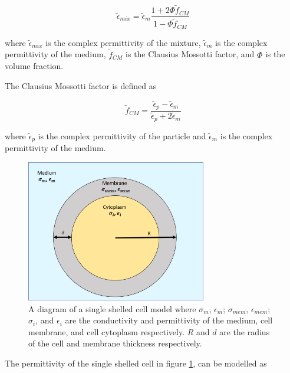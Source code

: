   \begin{equation}
      \tilde{\epsilon}_{mix} = \tilde{\epsilon}_m\frac{1 + 2\Phi\tilde{f}_{CM}}{1-\Phi\tilde{f}_{CM}}
  \end{equation}
  
  \noindent where $\tilde{\epsilon}_{mix}$ is the complex permittivity of the mixture, $\tilde{\epsilon}_m$ is the complex permittivity of the medium, $\tilde{f}_{CM}$ is the Clausius Mossotti factor, and $\Phi$ is the volume fraction.
  
  \par The Clausius Mossotti factor is defined as 
  
  \begin{equation}
    \tilde{f}_{CM} = \frac{\tilde{\epsilon}_p - \tilde{\epsilon}_m}{\tilde{\epsilon}_p + 2\tilde{\epsilon}_m} 
  \end{equation}
  
  \noindent
  
  where $\tilde{\epsilon}_p$ is the complex permittivity of the particle and $\tilde{\epsilon}_m$ is the complex permittivity of the medium. 

 \begin{figure}[ht]
 \centering
 \includegraphics[width=0.7\textwidth]{images/singleShelledCell.png}
 \caption[Diagram of single shelled cell model.]{A diagram of a single shelled cell model where $\sigma_m$, $\epsilon_m$; $\sigma_{mem}$, $\epsilon_{mem}$; $\sigma_i$, and $\epsilon_i$ are the conductivity and permittivity of the medium, cell membrane, and cell cytoplasm respectively. $R$ and $d$ are the radius of the cell and membrane thickness respectively.}
 \label{fig:single_shell}
 \end{figure}

  \par The permittivity of the single shelled cell in figure \ref{fig:single_shell}, can be modelled as
  
